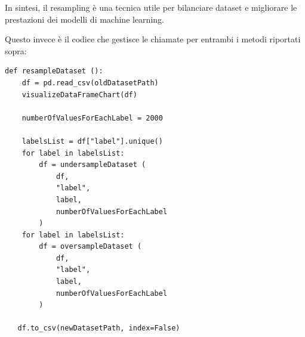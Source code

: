 In sintesi, il resampling è una tecnica utile per bilanciare dataset e migliorare le prestazioni dei modelli di machine learning. 

Questo invece è il codice che gestisce le chiamate per entrambi i metodi riportati sopra:
\begin{verbatim}
def resampleDataset ():
    df = pd.read_csv(oldDatasetPath)
    visualizeDataFrameChart(df)

    numberOfValuesForEachLabel = 2000

    labelsList = df["label"].unique()
    for label in labelsList:
        df = undersampleDataset (
            df, 
            "label", 
            label, 
            numberOfValuesForEachLabel
        )
    for label in labelsList:
        df = oversampleDataset (
            df, 
            "label", 
            label, 
            numberOfValuesForEachLabel
        )

   df.to_csv(newDatasetPath, index=False)
\end{verbatim}



